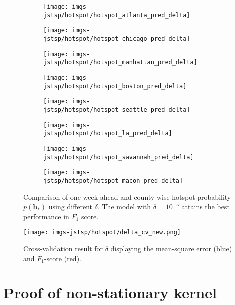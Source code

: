 \documentclass[journal]{IEEEtran}
\begin{document}
\begin{figure}[h!]
\centering
\begin{subfigure}[h]{0.45\linewidth}
\texttt{[image: imgs-jstsp/hotspot/hotspot\_atlanta\_pred\_delta]}
\end{subfigure}
\begin{subfigure}[h]{0.45\linewidth}
\texttt{[image: imgs-jstsp/hotspot/hotspot\_chicago\_pred\_delta]}
\end{subfigure}
\vfill
\begin{subfigure}[h]{0.45\linewidth}
\texttt{[image: imgs-jstsp/hotspot/hotspot\_manhattan\_pred\_delta]}
\end{subfigure}
\begin{subfigure}[h]{0.45\linewidth}
\texttt{[image: imgs-jstsp/hotspot/hotspot\_boston\_pred\_delta]}
\end{subfigure}
\vfill
\begin{subfigure}[h]{0.45\linewidth}
\texttt{[image: imgs-jstsp/hotspot/hotspot\_seattle\_pred\_delta]}
\end{subfigure}
\begin{subfigure}[h]{0.45\linewidth}
\texttt{[image: imgs-jstsp/hotspot/hotspot\_la\_pred\_delta]}
\end{subfigure}
\vfill
\begin{subfigure}[h]{0.45\linewidth}
\texttt{[image: imgs-jstsp/hotspot/hotspot\_savannah\_pred\_delta]}
\end{subfigure}
\begin{subfigure}[h]{0.45\linewidth}
\texttt{[image: imgs-jstsp/hotspot/hotspot\_macon\_pred\_delta]}
\end{subfigure}
\caption{Comparison of one-week-ahead and county-wise hotspot probability $p(\mathbf{h}_*)$ using different $\delta$. The model with $\delta=10^{-5}$ attains the best performance in $F_1$ score.}
\label{fig:cv-delta-insample}
\end{figure}

\begin{figure}[h!]
\centering
\texttt{[image: imgs-jstsp/hotspot/delta\_cv\_new.png]}
\caption{Cross-validation result for $\delta$ displaying the mean-square error (blue) and $F_1$-score (red).}
\label{fig:cv-delta-outofsample}
\end{figure}


\section{Proof of non-stationary kernel}
\label{append:proof-non-stationary-kernel}
\end{document}

